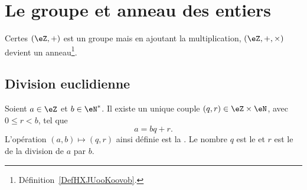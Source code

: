 
\section{Le groupe et anneau des entiers}

Certes \( (\eZ,+)\) est un groupe mais en ajoutant la multiplication, \( (\eZ,+,\times)\) devient un anneau\footnote{Définition~\ref{DefHXJUooKoovob}.}.

\subsection{Division euclidienne}

\begin{theoremDef}     \label{ThoDivisEuclide}
    Soient \( a\in\eZ\) et \( b\in\eN^*\). Il existe un unique couple \( (q,r)\in\eZ\times\eN\), avec \( 0\leq r<b\), tel que
    \begin{equation}
        a=bq+r.
    \end{equation}
    L'opération \( (a,b)\mapsto(q,r)\) ainsi définie est la . Le nombre \( q\) est le  et \( r\) est le  de la division de \( a\) par \( b\).
\end{theoremDef}

